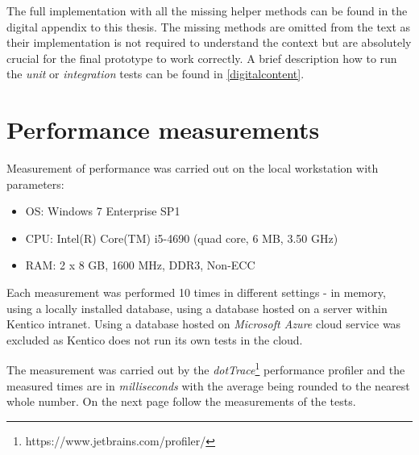 \documentclass[
  print,
  table,
  nolof,
  nolot,
  nocover,
  oneside
]{fithesis3}
\begin{document}
The full implementation with all the missing helper methods can be found in the digital appendix to this thesis. The missing methods are omitted from the text as their implementation is not required to understand the context but are absolutely crucial for the final prototype to work correctly.  A brief description how to run the \textit{unit} or \textit{integration} tests can be found in \autoref{digitalcontent}.


\section{Performance measurements}
\label{performance measurements}

Measurement of performance was carried out on the local workstation with parameters:
\begin{itemize}
    \item OS: Windows 7 Enterprise SP1
    \item CPU: Intel(R) Core(TM) i5-4690 (quad core, 6 MB, 3.50 GHz)
    \item RAM: 2 x 8 GB, 1600 MHz, DDR3, Non-ECC
\end{itemize}

Each measurement was performed 10 times in different settings - in memory, using a locally installed database, using a database hosted on a server within Kentico intranet. Using a database hosted on \textit{Microsoft Azure} cloud service was excluded as Kentico does not run its own tests in the cloud.

The measurement was carried out by the \textit{dotTrace}\footnote{https://www.jetbrains.com/profiler/} performance profiler and the measured times are in \textit{milliseconds} with the average being rounded to the nearest whole number. On the next page follow the measurements of the tests.
\newpage
\end{document}
